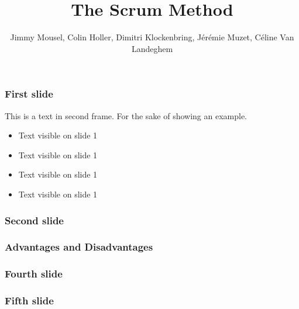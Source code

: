 \documentclass{beamer}
\title{The Scrum Method}
\author{Jimmy Mousel, Colin Holler, Dimitri Klockenbring, Jérémie Muzet, Céline Van Landeghem}
\date{}
\begin{document}
\frame{\titlepage}


\begin{frame}
    \frametitle{First slide}
    
    This is a text in second frame. 
    For the sake of showing an example.
    
    \begin{itemize}
     \item<1-> Text visible on slide 1
     \item<2-> Text visible on slide 1
     \item<3> Text visible on slide 1
     \item<4-> Text visible on slide 1
    \end{itemize}
    
\end{frame}

\begin{frame}
    \frametitle{Second slide}
    
\end{frame}

\begin{frame}
    \frametitle{Advantages and Disadvantages}

    
\end{frame}

\begin{frame}
    \frametitle{Fourth slide}
    
    
    
\end{frame}

\begin{frame}
    \frametitle{Fifth slide}
    
    
    
\end{frame}
\end{document}
